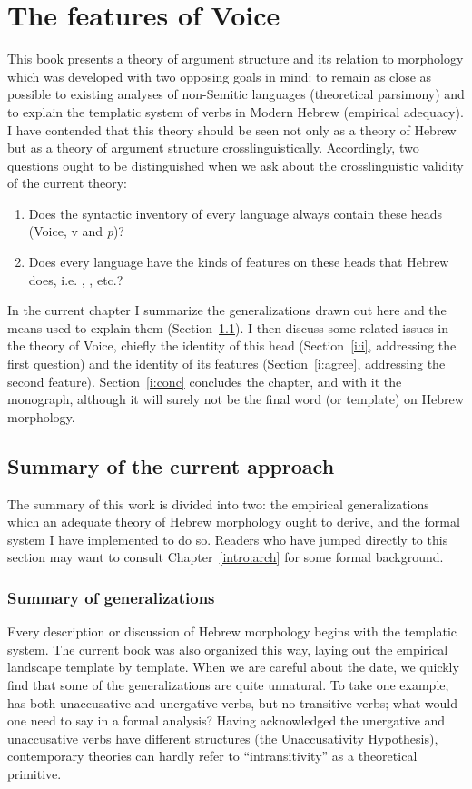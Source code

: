 \chapter{The features of Voice}
\label{chap:i}

This book presents a theory of argument structure and its relation to morphology which was developed with two opposing goals in mind: to remain as close as possible to existing analyses of non-Semitic languages (theoretical parsimony) and to explain the templatic system of verbs in Modern Hebrew (empirical adequacy). I have contended that this theory should be seen not only as a theory of Hebrew but as a theory of argument structure crosslinguistically. Accordingly, two questions ought to be distinguished when we ask about the crosslinguistic validity of the current theory:
\begin{enumerate}
	\item Does the syntactic inventory of every language always contain these heads (Voice, v and \emph{p})?
	\item Does every language have the kinds of features on these heads that Hebrew does, i.e. {\vd}, \pz, etc.?
\end{enumerate}

In the current chapter I summarize the generalizations drawn out here and the means used to explain them (Section~\ref{i:sum}). I then discuss some related issues in the theory of Voice, chiefly the identity of this head (Section~\ref{i:i}, addressing the first question) and the identity of its features (Section~\ref{i:agree}, addressing the second feature). Section~\ref{i:conc} concludes the chapter, and with it the monograph, although it will surely not be the final word (or template) on Hebrew morphology.


\section{Summary of the current approach} \label{i:sum}
The summary of this work is divided into two: the empirical generalizations which an adequate theory of Hebrew morphology ought to derive, and the formal system I have implemented to do so. Readers who have jumped directly to this section may want to consult Chapter~\ref{intro:arch} for some formal background.

	\subsection{Summary of generalizations}
Every description or discussion of Hebrew morphology begins with the templatic system. The current book was also organized this way, laying out the empirical landscape template by template. When we are careful about the date, we quickly find that some of the generalizations are quite unnatural. To take one example, {\tnif} has both unaccusative and unergative verbs, but no transitive verbs; what would one need to say in a formal analysis? Having acknowledged the unergative and unaccusative verbs have different structures (the Unaccusativity Hypothesis), contemporary theories can hardly refer to ``intransitivity'' as a theoretical primitive.

